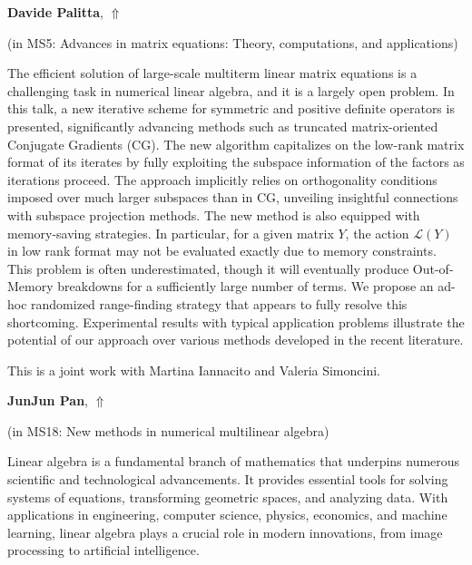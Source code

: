 \documentclass[ILAS2025-program.tex]{subfiles}
\begin{document}
\hypertarget{down0322}{}\begin{ilasabstract}
    
\textbf{Davide Palitta},  \hfill \hyperlink{up0322}{$\Uparrow$}
    
    
(in {\color{mstitle}MS5: Advances in matrix equations: Theory, computations, and applications})
        
\mtskip
    The efficient solution of large-scale multiterm linear matrix equations is a challenging task in numerical linear algebra, and it is a largely open problem. In this talk, a new iterative scheme for symmetric and positive definite operators is presented, significantly advancing methods such as truncated matrix-oriented Conjugate Gradients (CG). The new algorithm capitalizes on the low-rank matrix format of its iterates by fully exploiting the subspace information of the factors as iterations proceed. The approach implicitly relies on orthogonality conditions imposed over much larger subspaces than in CG, unveiling insightful connections with subspace projection methods. The new method is also equipped with memory-saving strategies. In particular, for a given matrix $Y$, the action $\mathcal{L}(Y)$ in low rank format may not be evaluated exactly due to memory constraints. This problem is often underestimated, though it will eventually produce Out-of-Memory breakdowns for a sufficiently large number of terms. We propose an ad-hoc randomized range-finding strategy that appears to fully resolve this shortcoming. Experimental results with typical application problems illustrate the potential of our approach over various methods developed in the recent literature.

This is a joint work with Martina Iannacito and Valeria Simoncini.

\end{ilasabstract}
    

\hypertarget{down0190}{}\begin{ilasabstract}
    
\textbf{JunJun Pan},  \hfill \hyperlink{up0190}{$\Uparrow$}
    
    
(in {\color{mstitle}MS18: New methods in numerical multilinear algebra})
        
\mtskip
    Linear algebra is a fundamental branch of mathematics that underpins numerous scientific and technological advancements. It provides essential tools for solving systems of equations, transforming geometric spaces, and analyzing data. With applications in engineering, computer science, physics, economics, and machine learning, linear algebra plays a crucial role in modern innovations, from image processing to artificial intelligence. 

\end{ilasabstract}
    
\end{document}
